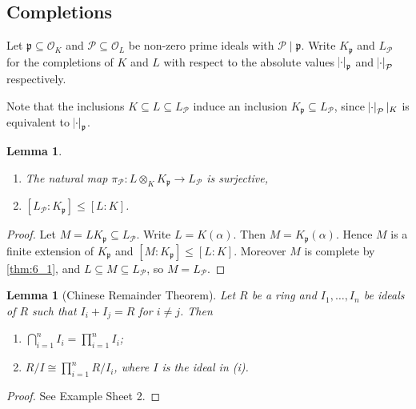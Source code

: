\documentclass[11pt]{article}
\theoremstyle{definition}
\theoremstyle{plain}
\newtheorem{lemma}[definition]{Lemma}
\theoremstyle{remark}
\newcommand{\cO}{\mathcal{O}}
\newcommand{\cP}{\mathcal{P}}
\newcommand{\fp}{\mathfrak{p}}
\begin{document}
\subsection*{Completions}

Let $\fp \subseteq \cO_K$ and $\cP \subseteq \cO_L$ be non-zero prime ideals with $\cP \mid \fp$. Write $K_\fp$ and $L_\cP$ for the completions of $K$ and $L$ with respect to the absolute values $\abs{\cdot}_\fp$ and $\abs{\cdot}_\cP$ respectively.

Note that the inclusions $K \subseteq L \subseteq L_\cP$ induce an inclusion $K_\fp \subseteq L_\cP$, since $\abs{\cdot}_\cP \vert_K$ is equivalent to $\abs{\cdot}_\fp$.

\begin{lemma}\label{lem:10_7}\phantom{}
    \begin{enumerate}
        \item The natural map $\pi_\cP : L \otimes_K K_\fp \to L_\cP$ is surjective,
        \item $[L_\cP : K_\fp] \le [L : K]$.
    \end{enumerate}
\end{lemma}
\begin{proof}
    Let $M = L K_\fp \subseteq L_\cP$. Write $L = K(\alpha)$. Then $M = K_\fp(\alpha)$. Hence $M$ is a finite extension of $K_\fp$ and $[M : K_\fp] \le [L : K]$. Moreover $M$ is complete by \autoref{thm:6_1}, and $L \subseteq M \subseteq L_\cP$, so $M = L_\cP$.
\end{proof}

\begin{lemma}[Chinese Remainder Theorem]\label{lem:10_8}
    Let $R$ be a ring and $I_1, \ldots, I_n$ be ideals of $R$ such that $I_i + I_j = R$ for $i \neq j$. Then
    \begin{enumerate}
        \item $\bigcap_{i=1}^n I_i = \prod_{i=1}^n I_i$;
        \item $R / I \cong \prod_{i=1}^n R/I_i$, where $I$ is the ideal in (i).
    \end{enumerate}
\end{lemma}
\begin{proof}
    See Example Sheet 2.
\end{proof}
\end{document}
